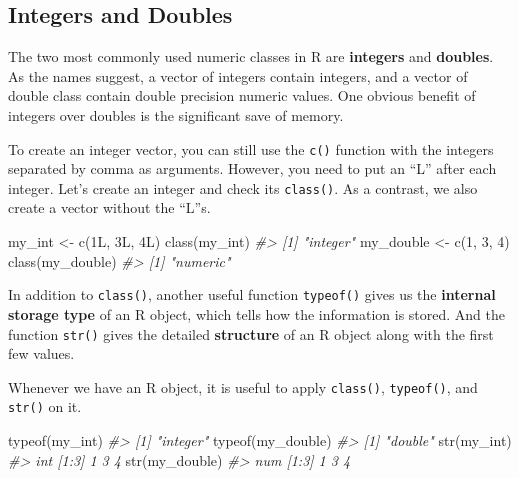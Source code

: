 \documentclass[
]{book}
\newenvironment{Shaded}{\begin{snugshade}}{\end{snugshade}}
\newcommand{\CommentTok}[1]{\textcolor[rgb]{0.56,0.35,0.01}{\textit{#1}}}
\newcommand{\DecValTok}[1]{\textcolor[rgb]{0.00,0.00,0.81}{#1}}
\newcommand{\FunctionTok}[1]{\textcolor[rgb]{0.00,0.00,0.00}{#1}}
\newcommand{\NormalTok}[1]{#1}
\newcommand{\OtherTok}[1]{\textcolor[rgb]{0.56,0.35,0.01}{#1}}
\begin{document}
\hypertarget{integer-double}{%
\subsection{Integers and Doubles}\label{integer-double}}

The two most commonly used numeric classes in R are \textbf{integers} and \textbf{doubles}. As the names suggest, a vector of integers contain integers, and a vector of double class contain double precision numeric values. One obvious benefit of integers over doubles is the significant save of memory.

To create an integer vector, you can still use the \texttt{c()} function with the integers separated by comma as arguments. However, you need to put an ``L'' after each integer. Let's create an integer and check its \texttt{class()}. As a contrast, we also create a vector without the ``L''s.

\begin{Shaded}
\begin{Highlighting}[]
\NormalTok{my\_int }\OtherTok{\textless{}{-}} \FunctionTok{c}\NormalTok{(1L, 3L, 4L)}
\FunctionTok{class}\NormalTok{(my\_int)}
\CommentTok{\#\textgreater{} [1] "integer"}
\NormalTok{my\_double }\OtherTok{\textless{}{-}} \FunctionTok{c}\NormalTok{(}\DecValTok{1}\NormalTok{, }\DecValTok{3}\NormalTok{, }\DecValTok{4}\NormalTok{)}
\FunctionTok{class}\NormalTok{(my\_double)}
\CommentTok{\#\textgreater{} [1] "numeric"}
\end{Highlighting}
\end{Shaded}

In addition to \texttt{class()}, another useful function \texttt{typeof()} gives us the \textbf{internal storage type} of an R object, which tells how the information is stored. And the function \texttt{str()} gives the detailed \textbf{structure} of an R object along with the first few values.

Whenever we have an R object, it is useful to apply \texttt{class()}, \texttt{typeof()}, and \texttt{str()} on it.

\begin{Shaded}
\begin{Highlighting}[]
\FunctionTok{typeof}\NormalTok{(my\_int)}
\CommentTok{\#\textgreater{} [1] "integer"}
\FunctionTok{typeof}\NormalTok{(my\_double) }
\CommentTok{\#\textgreater{} [1] "double"}
\FunctionTok{str}\NormalTok{(my\_int)}
\CommentTok{\#\textgreater{}  int [1:3] 1 3 4}
\FunctionTok{str}\NormalTok{(my\_double)}
\CommentTok{\#\textgreater{}  num [1:3] 1 3 4}
\end{Highlighting}
\end{Shaded}
\end{document}

